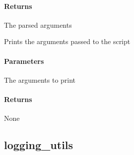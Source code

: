 \documentclass[letterpaper,10pt,english]{sphinxmanual}
\begin{document}
\begin{fulllineitems}
\begin{fulllineitems}
\paragraph{Returns}
\label{\detokenize{autoapi/base_options/index:id2}}\begin{description}
\sphinxAtStartPar
The parsed arguments

\end{description}

\end{fulllineitems}


\begin{fulllineitems}
\label{\detokenize{autoapi/base_options/index:base_options.BaseOptions._print}}
\pysigstartsignatures
{}
\pysigstopsignatures
\sphinxAtStartPar
Prints the arguments passed to the script


\paragraph{Parameters}
\label{\detokenize{autoapi/base_options/index:id3}}\begin{description}
\sphinxAtStartPar
The arguments to print

\end{description}


\paragraph{Returns}
\label{\detokenize{autoapi/base_options/index:id4}}
\sphinxAtStartPar
None

\end{fulllineitems}


\end{fulllineitems}


\sphinxstepscope


\subsection{logging\_utils}
\label{\detokenize{autoapi/logging_utils/index:module-logging_utils}}\label{\detokenize{autoapi/logging_utils/index:logging-utils}}\label{\detokenize{autoapi/logging_utils/index::doc}}
\end{document}

